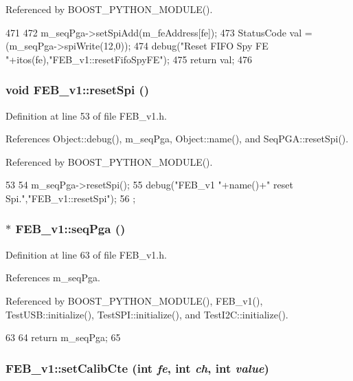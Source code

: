 Referenced by BOOST\_\-PYTHON\_\-MODULE().


\begin{DoxyCode}
471                                        {  
472   m_seqPga->setSpiAdd(m_feAddress[fe]);
473   StatusCode val = (m_seqPga->spiWrite(12,0));
474   debug("Reset FIFO Spy FE "+itos(fe),"FEB_v1::resetFifoSpyFE");
475   return val;
476 }
\end{DoxyCode}
\hypertarget{classFEB__v1_a1a50b5fff8a6e170fe136657f75b8ad4}{
\subsubsection[{resetSpi}]{\setlength{\rightskip}{0pt plus 5cm}void FEB\_\-v1::resetSpi ()}}
\label{classFEB__v1_a1a50b5fff8a6e170fe136657f75b8ad4}


Definition at line 53 of file FEB\_\-v1.h.

References Object::debug(), m\_\-seqPga, Object::name(), and SeqPGA::resetSpi().

Referenced by BOOST\_\-PYTHON\_\-MODULE().


\begin{DoxyCode}
53                   {
54     m_seqPga->resetSpi();
55     debug("FEB_v1 "+name()+" reset Spi.","FEB_v1::resetSpi");
56   };
\end{DoxyCode}
\hypertarget{classFEB__v1_a8bf655504f9b0c51d5aa5bc6b30da00d}{
\subsubsection[{seqPga}]{$\ast$ FEB\_\-v1::seqPga ()}}
\label{classFEB__v1_a8bf655504f9b0c51d5aa5bc6b30da00d}


Definition at line 63 of file FEB\_\-v1.h.

References m\_\-seqPga.

Referenced by BOOST\_\-PYTHON\_\-MODULE(), FEB\_\-v1(), TestUSB::initialize(), TestSPI::initialize(), and TestI2C::initialize().


\begin{DoxyCode}
63                   {
64     return m_seqPga;
65   }
\end{DoxyCode}
\hypertarget{classFEB__v1_acf3c8ad478ce506bb9d9cb3e4d3b6252}{
\subsubsection[{setCalibCte}]{ FEB\_\-v1::setCalibCte (int {\em fe}, \/  int {\em ch}, \/  int {\em value})}}
\label{classFEB__v1_acf3c8ad478ce506bb9d9cb3e4d3b6252}


